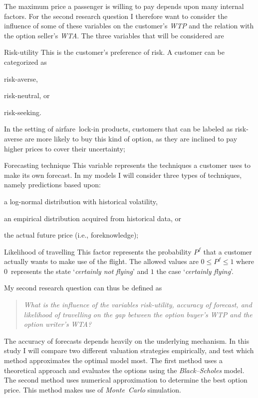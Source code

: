 The maximum price a passenger is willing to pay depends upon many internal factors. For the second research question I therefore want to consider the influence of some of these variables on the customer's \emph{WTP} and the relation with the option seller's \emph{WTA}. The three variables that will be considered are
\begin{compactdesc}
\item[Risk-utility] This is the customer's preference of risk. A customer can be categorized as \begin{inparaenum}
\item risk-averse,
\item risk-neutral, or
\item risk-seeking.
\end{inparaenum} In the setting of airfare~lock-in products, customers that can be labeled as risk-averse are more likely to buy this kind of option, as they are inclined to pay higher prices to cover their uncertainty;
\item[Forecasting technique] This variable represents the techniques a customer uses to make its own forecast. In my models I will consider three types of techniques, namely predictions based upon: \begin{inparaenum}
\item a log-normal distribution with historical volatility,
\item an empirical distribution acquired from historical data, or
\item the actual future price (i.e., foreknowledge);
\end{inparaenum}
\item[Likelihood of travelling] This factor represents the probability $P^f$ that a customer actually wants to make use of the flight. The allowed values are $0 \le P^f \le 1$ where $0$~represents the state `\emph{certainly not flying}' and $1$ the case  `\emph{certainly flying}'.
\vspace{1em}
\end{compactdesc}

\noindent
My second research question can thus be defined as
\begin{quote}\emph{What is the influence of the variables risk-utility, accuracy of forecast, and likelihood of travelling on the gap between the option buyer's WTP and the option writer's WTA?}\end{quote}

The accuracy of forecasts depends heavily on the underlying mechanism. In this study I will compare two different valuation strategies empirically, and test which meth\-od ap\-prox\-i\-mates the optimal model most. The first method uses a theoretical approach and evaluates the options using the \emph{Black--Scholes} model. The second method uses numerical approximation to determine the best option price. This method makes use of \emph{Monte~Carlo} simulation.

